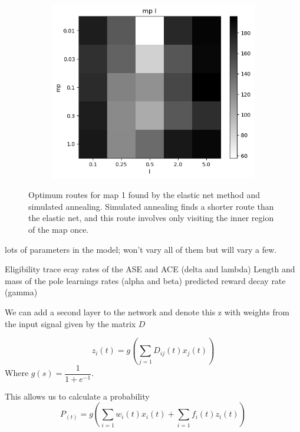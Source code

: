 \documentclass{article}
\begin{document}
\begin{figure}[h]
\begin{subfigure}[t]{0.28\linewidth}
		\label{fig:comp1an}	
	\end{subfigure}
	\begin{subfigure}[t]{0.28\linewidth}
		\centering
		\includegraphics[width = 1.0\linewidth, trim={0 0 0 0}, clip=true]{figures/test_mp_l_heat.png}
		\label{fig:comp1an}	
	\end{subfigure}
\caption{Optimum routes for map 1 found by the elastic net method and simulated annealing. Simulated annealing finds a shorter route than the elastic net, and this route involves only visiting the inner region of the map once. }
\label{fig:comp1}
\end{figure}

lots of parameters in the model; won't vary all of them but will vary a few.

Eligibility trace ecay rates of the ASE and ACE (delta and lambda)
Length and mass of the pole
learnings rates (alpha and beta)
predicted reward decay rate (gamma)


We can add a second layer to the network and denote this z with weights from the input signal given by the matrix $D$

\begin{equation}
z_i(t) = g(\sum_{j=1}{D_{ij}(t) x_j(t)})
\end{equation}
Where $g(s) = \dfrac{1}{1+e^{-1}}$.

This allows us to calculate a probability
\begin{equation}
P_(t) = g(\sum_{i=1}{w_{i}(t) x_i(t)} + \sum_{i=1}{f_i(t)z_i(t)})
\end{equation}
\end{document}
